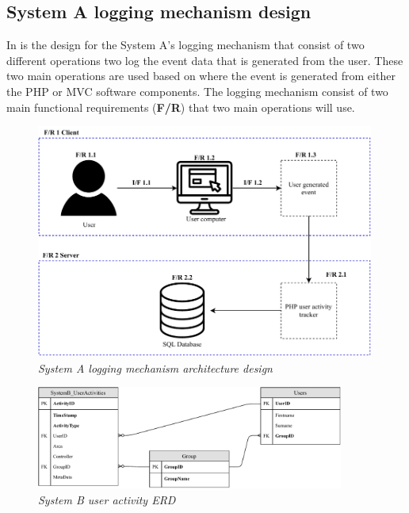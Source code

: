 \clearpage

\subsection{System A logging mechanism design}

In  is the design for the System A's logging mechanism that consist of two different operations two log the event data that is generated from the user. These two main operations are used based on where the event is generated from either the PHP or MVC software components. The logging mechanism consist of two main functional requirements (\textbf{F/R}) that two main operations will use.

\begin{figure}[!htb] %
	\centering %
	\includegraphics[width=0.99\textwidth]{Images/Chapter2/SystemA_Architecture_Diagram/SystemA_Architecture_Diagram.pdf}
	\caption[System A logging mechanism architecture design]
	{\textit{System A logging mechanism architecture design}}\label{fig:ch2_SystemA_Arch_Design}
\end{figure}

\clearpage

\begin{figure}[!htb] %
	\centering %
	\includegraphics[width=0.9\textwidth]{Images/Chapter2/SystemB_ERD_Basic/SystemB_ERD_Basic.pdf}
	\caption[System B user activity ERD]
	{\textit{System B user activity ERD}}\label{fig:ch2_SystemB_Basic_ERD}
\end{figure}

